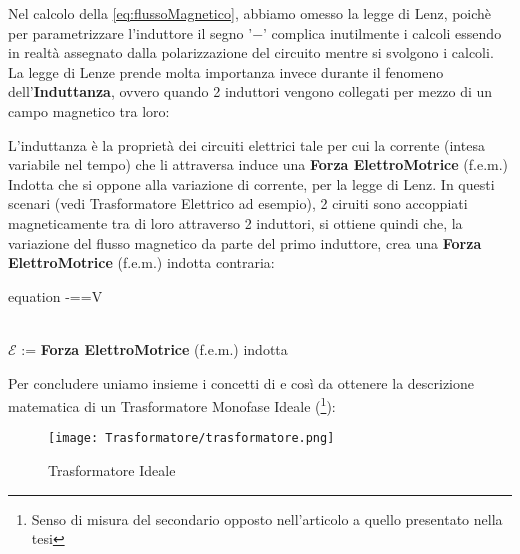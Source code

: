 \noindent
Nel calcolo della \ref{eq:flussoMagnetico}, abbiamo omesso la legge di Lenz, poichè per parametrizzare l'induttore il segno '$ - $' complica inutilmente i calcoli essendo in realtà assegnato dalla polarizzazione del circuito mentre si svolgono i calcoli.\\
La legge di Lenze prende molta importanza invece durante il fenomeno dell'\textbf{Induttanza}, ovvero quando 2 induttori vengono collegati per mezzo di un campo magnetico tra loro:
\begin{de} 
	L'induttanza è la proprietà dei circuiti elettrici tale per cui la corrente (intesa variabile nel tempo) che li attraversa induce una \textbf{Forza ElettroMotrice} (f.e.m.) Indotta che si oppone alla variazione di corrente, per la legge di Lenz.
	In questi scenari (vedi Trasformatore Elettrico ad esempio), 2 ciruiti sono accoppiati magneticamente tra di loro attraverso 2 induttori, si ottiene quindi che, la variazione del flusso magnetico da parte del primo induttore, crea una \textbf{Forza ElettroMotrice} (f.e.m.) indotta contraria:
	\begin{vwcol}[widths={0.4,0.6}, sep=8mm, rule=0px]
		\vspace{-3mm}
		\begin{empheq}[box=\mathCalc]{equation}
			{\displaystyle -{}={}=V}
		\end{empheq}
		\newpage %
		\hfill\break \hfill\\[2mm]
		$ \mathcal{E} $ := \textbf{Forza ElettroMotrice} (f.e.m.) indotta
	\end{vwcol}
\end{de}
\noindent
Per concludere uniamo insieme i concetti di  e  così da ottenere la descrizione matematica di un Trasformatore Monofase Ideale (\cite{Transformatore}\footnote{Senso di misura del secondario opposto nell'articolo a quello presentato nella tesi}):
\begin{figure}[H]
	\centering
	\caption[Trasformatore ideale con Campo magnetico]{Trasformatore Ideale}
	\texttt{[image: Trasformatore/trasformatore.png]}
\end{figure}

